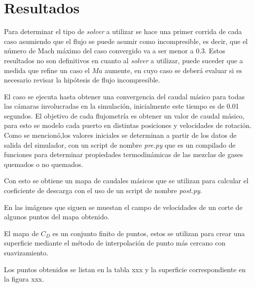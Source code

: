 
\section{Resultados}

Para determinar el tipo de \emph{solver} a utilizar se hace una primer corrida
de cada caso asumiendo que el flujo se puede asumir como incompresible, es
decir, que el número de Mach máximo del caso convergido va a ser menor a 0.3.
%
Estos resultados no son definitivos en cuanto al \emph{solver} a utilizar,
puede suceder que a medida que refine un caso el $Ma$ aumente, en cuyo caso
se deberá evaluar si es necesario revisar la hipótesis de flujo incompresible.


El caso se ejecuta hasta obtener una convergencia del caudal másico para todas
las cámaras involucradas en la simulación, inicialmente este tiempo es de 0.01
segundos.
%
El objetivo de cada flujometría es obtener un valor de caudal másico, para esto
se modelo cada puerto en distintas posiciones y velocidades de rotación.
%
Como se mencionó,los valores iniciales se determinan a partir de los datos de
salida del simulador, con un script de nombre \emph{pre.py} que es un compilado
de funciones para determinar propiedades termodinámicas de las mezclas de gases
quemados o no quemados.

Con esto se obtiene un mapa de caudales másicos que se utilizan para calcular
el coeficiente de descarga con el uso de un script de nombre \emph{post.py}.


En las imágenes que siguen se muestan el campo de velocidades de un corte de
algunos puntos del mapa obtenido.


El mapa de $C_D$ es un conjunto finito de puntos, estos se utilizan para crear
una superficie mediante el método de interpolación de punto más cercano con
suavizamiento.

Los puntos obtenidos se listan en la tabla xxx y la superficie correspondiente
en la figura xxx.

